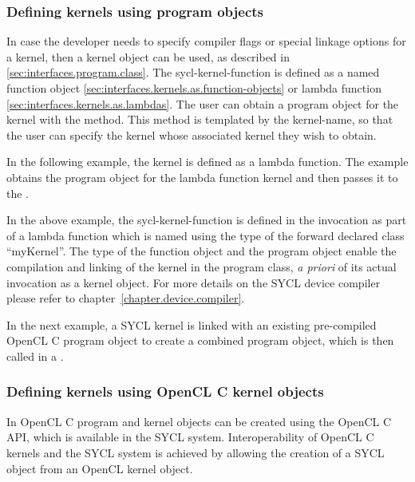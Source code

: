 \subsubsection{Defining kernels using program objects}

In case the developer needs to specify compiler flags or special linkage options
for a kernel, then a kernel object can be used, as described in
\ref{sec:interfaces.program.class}. The \gls{sycl-kernel-function} is defined
as a named function object
\ref{sec:interfaces.kernels.as.function-objects} or lambda function
\ref{sec:interfaces.kernels.as.lambdas}. The user can obtain a program
object for the kernel with the  method. This
method is templated by the \gls{kernel-name}, so that the user
can specify the kernel whose associated kernel they wish to obtain.

In the following example, the kernel is defined as a lambda function.
The example obtains the program object for the lambda function kernel
and then passes it to the .


In the above example, the \gls{sycl-kernel-function} is defined in the
 invocation as part of a lambda function which is named
using the type of the forward declared class ``myKernel''. The type of the
function object and the program object enable the compilation and linking of the kernel
in the program class, \emph{a priori} of its actual invocation as a kernel
object. For more details on the SYCL device compiler please refer to
chapter~\ref{chapter.device.compiler}.

In the next example, a SYCL kernel is linked with an existing pre-compiled
OpenCL C program object to create a combined program object, which is then
called in a .


\subsubsection{Defining kernels using OpenCL C kernel objects}
\label{sec:interfaces.kernels.opencl.objects}

In OpenCL C \cite{opencl12} program and kernel objects can be created
using the OpenCL C API, which is available in the SYCL
system. Interoperability of OpenCL C kernels and the SYCL system is
achieved by allowing the creation of a SYCL  object from
an OpenCL \gls{kernel} object.

